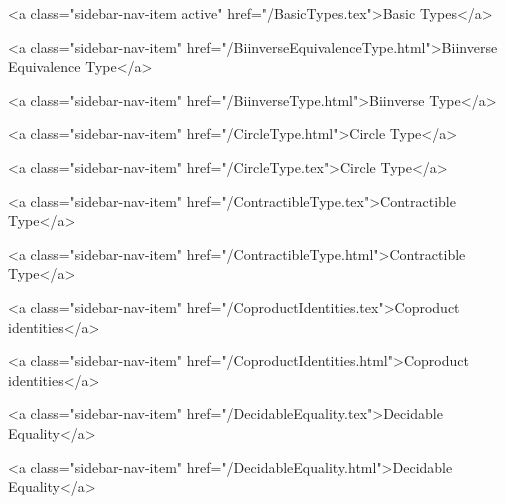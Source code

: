           <a class="sidebar-nav-item active" href="/BasicTypes.tex">Basic Types</a>
        
      
    
      
        
          <a class="sidebar-nav-item" href="/BiinverseEquivalenceType.html">Biinverse Equivalence Type</a>
        
      
    
      
        
          <a class="sidebar-nav-item" href="/BiinverseType.html">Biinverse Type</a>
        
      
    
      
        
          <a class="sidebar-nav-item" href="/CircleType.html">Circle Type</a>
        
      
    
      
        
          <a class="sidebar-nav-item" href="/CircleType.tex">Circle Type</a>
        
      
    
      
        
          <a class="sidebar-nav-item" href="/ContractibleType.tex">Contractible Type</a>
        
      
    
      
        
          <a class="sidebar-nav-item" href="/ContractibleType.html">Contractible Type</a>
        
      
    
      
        
          <a class="sidebar-nav-item" href="/CoproductIdentities.tex">Coproduct identities</a>
        
      
    
      
        
          <a class="sidebar-nav-item" href="/CoproductIdentities.html">Coproduct identities</a>
        
      
    
      
        
          <a class="sidebar-nav-item" href="/DecidableEquality.tex">Decidable Equality</a>
        
      
    
      
        
          <a class="sidebar-nav-item" href="/DecidableEquality.html">Decidable Equality</a>
        
